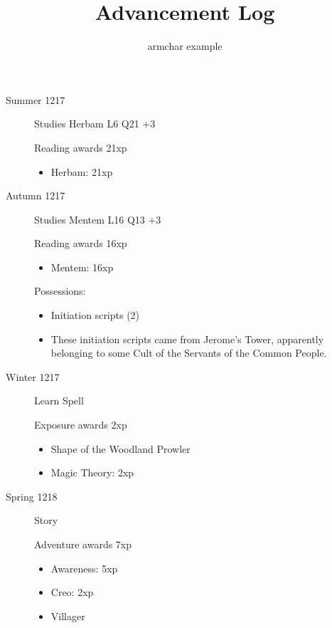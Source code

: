 \documentclass{scrartcl}
\title{Advancement Log}
\author{armchar example}
\begin{document}
\maketitle
\begin{description}
  \item[Summer 1217]
    Studies Herbam L6 Q21 +3

    Reading awards 21xp
    \begin{itemize}
      \item Herbam: 21xp
    \end{itemize}
  \item[Autumn 1217]
    Studies Mentem L16 Q13 +3

    Reading awards 16xp
    \begin{itemize}
      \item Mentem: 16xp
    \end{itemize}
    Possessions:
    \begin{itemize}
      \item Initiation scripts (2)
      \item These initiation scripts came from Jerome's Tower, apparently belonging to some Cult of the Servants of the Common People.
    \end{itemize}
  \item[Winter 1217]
    Learn Spell

    Exposure awards 2xp
    \begin{itemize}
      \item Shape of the Woodland Prowler
      \item Magic Theory: 2xp
    \end{itemize}
  \item[Spring 1218]
    Story

    Adventure awards 7xp
    \begin{itemize}
      \item Awareness: 5xp
      \item Creo: 2xp
      \item Villager
    \end{itemize}
\end{description}
\end{document}
